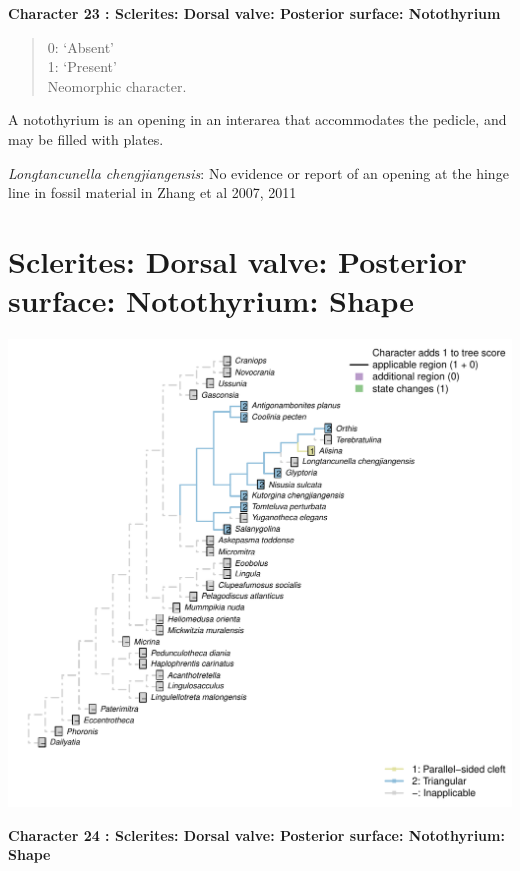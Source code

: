 \documentclass[]{book}
\theoremstyle{definition}
\theoremstyle{definition}
\theoremstyle{definition}
\theoremstyle{remark}
\begin{document}
\textbf{Character 23 : Sclerites: Dorsal valve: Posterior surface:
Notothyrium }

\begin{quote}
0: `Absent'\\
1: `Present'\\
Neomorphic character.
\end{quote}

A notothyrium is an opening in an interarea that accommodates the
pedicle, and may be filled with plates.

\emph{Longtancunella chengjiangensis}: No evidence or report of an
opening at the hinge line in fossil material in Zhang et al 2007, 2011

\hypertarget{sclerites-dorsal-valve-posterior-surface-notothyrium-shape}{%
\section*{Sclerites: Dorsal valve: Posterior surface: Notothyrium:
Shape}\label{sclerites-dorsal-valve-posterior-surface-notothyrium-shape}}

\includegraphics{Brachiopod_phylogeny_files/figure-latex/unnamed-chunk-5-24.pdf}

\textbf{Character 24 : Sclerites: Dorsal valve: Posterior surface:
Notothyrium: Shape }
\end{document}
